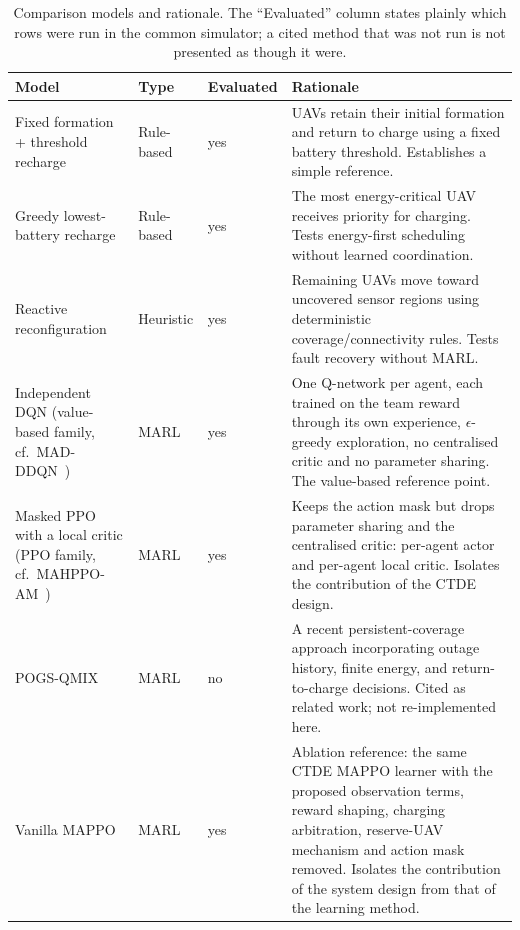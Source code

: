 \documentclass[conference]{IEEEtran}
\begin{document}
\begin{table}[t]
\caption{Comparison models and rationale. The ``Evaluated'' column states
plainly which rows were run in the common simulator; a cited method that was
not run is not presented as though it were.}
\label{tab:comparison}
\centering
\scriptsize
\renewcommand{\arraystretch}{1.06}
\begin{tabularx}{\columnwidth}{@{}L{1.28cm}L{0.92cm}L{1.05cm}Y@{}}
\toprule
Model & Type & Evaluated & Rationale \\
\midrule
Fixed formation + threshold recharge & Rule-based & yes & UAVs retain their initial formation and return to charge using a fixed battery threshold. Establishes a simple reference. \\
Greedy lowest-battery recharge & Rule-based & yes & The most energy-critical UAV receives priority for charging. Tests energy-first scheduling without learned coordination. \\
Reactive reconfiguration & Heuristic & yes & Remaining UAVs move toward uncovered sensor regions using deterministic coverage/connectivity rules. Tests fault recovery without MARL. \\
Independent DQN (value-based family, cf.\ MAD-DDQN~\cite{omoniwa2022}) & MARL & yes & One Q-network per agent, each trained on the team reward through its own experience, $\epsilon$-greedy exploration, no centralised critic and no parameter sharing. The value-based reference point. \\
Masked PPO with a local critic (PPO family, cf.\ MAHPPO-AM~\cite{sun2025}) & MARL & yes & Keeps the action mask but drops parameter sharing and the centralised critic: per-agent actor and per-agent local critic. Isolates the contribution of the CTDE design. \\
POGS-QMIX~\cite{mei2026} & MARL & no & A recent persistent-coverage approach incorporating outage history, finite energy, and return-to-charge decisions. Cited as related work; not re-implemented here. \\
Vanilla MAPPO~\cite{yu2022} & MARL & yes & Ablation reference: the same CTDE MAPPO learner with the proposed observation terms, reward shaping, charging arbitration, reserve-UAV mechanism and action mask removed. Isolates the contribution of the system design from that of the learning method. \\
\bottomrule
\end{tabularx}
\end{table}
\end{document}
